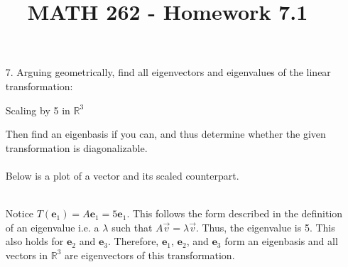 \documentclass[letterpaper,12pt]{article}
\author{}
\title{MATH 262 - Homework 7.1}
\date{} %
\begin{document}
\maketitle

\begin{enumerate}
  \item[7.]
    Arguing geometrically, find all eigenvectors and eigenvalues of the linear transformation:
    \begin{center}
      Scaling by 5 in $\mathbb{R}^3$
    \end{center}
    Then find an eigenbasis if you can, and thus determine whether the given transformation is diagonalizable. \\
    \\
    Below is a plot of a vector and its scaled counterpart. \\
     \\
    Notice $T(\mathbf{e}_1) = A\mathbf{e}_1 = 5\mathbf{e}_1$. This follows the form described in the definition of an eigenvalue i.e. a $\lambda$ such that $A\vec{v} = \lambda\vec{v}$. Thus, the eigenvalue is 5. This also holds for $\mathbf{e}_2$ and $\mathbf{e}_3$. Therefore, $\mathbf{e}_1$, $\mathbf{e}_2$, and $\mathbf{e}_3$ form an eigenbasis and all vectors in $\mathbb{R}^3$ are eigenvectors of this transformation.
\end{enumerate}
\end{document}

